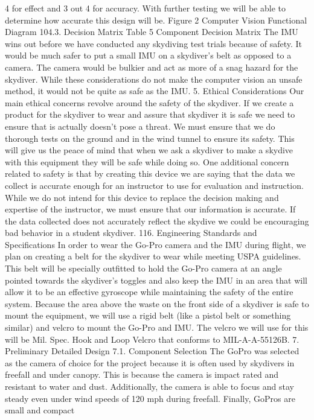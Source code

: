 4 for effect and 3 out 4 for accuracy. With further testing we will be able to determine how accurate this design will be.
Figure 2 Computer Vision Functional Diagram
104.3.
Decision Matrix
Table 5 Component Decision Matrix
The IMU wins out before we have conducted any skydiving test trials because of safety. It would be much safer to put a
small IMU on a skydiver’s belt as opposed to a camera. The camera would be bulkier and act as more of a snag hazard
for the skydiver. While these considerations do not make the computer vision an unsafe method, it would not be quite
as safe as the IMU.
5.
Ethical Considerations
Our main ethical concerns revolve around the safety of the skydiver. If we create a product for the skydiver to wear and
assure that skydiver it is safe we need to ensure that is actually doesn’t pose a threat. We must ensure that we do
thorough tests on the ground and in the wind tunnel to ensure its safety. This will give us the peace of mind that when
we ask a skydiver to make a skydive with this equipment they will be safe while doing so.
One additional concern related to safety is that by creating this device we are saying that the data we collect is accurate
enough for an instructor to use for evaluation and instruction. While we do not intend for this device to replace the
decision making and expertise of the instructor, we must ensure that our information is accurate. If the data collected
does not accurately reflect the skydive we could be encouraging bad behavior in a student skydiver.
116.
Engineering Standards and Specifications
In order to wear the Go-Pro camera and the IMU during flight, we plan on creating a belt for the skydiver to wear while
meeting USPA guidelines. This belt will be specially outfitted to hold the Go-Pro camera at an angle pointed towards the
skydiver’s toggles and also keep the IMU in an area that will allow it to be an effective gyroscope while maintaining the
safety of the entire system. Because the area above the waste on the front side of a skydiver is safe to mount the
equipment, we will use a rigid belt (like a pistol belt or something similar) and velcro to mount the Go-Pro and IMU. The
velcro we will use for this will be Mil. Spec. Hook and Loop Velcro that conforms to MIL-A-A-55126B.
7.
Preliminary Detailed Design
7.1.
Component Selection
The GoPro was selected as the camera of choice for the project because it is often used by skydivers in freefall and
under canopy. This is because the camera is impact rated and resistant to water and dust. Additionally, the camera is
able to focus and stay steady even under wind speeds of 120 mph during freefall. Finally, GoPros are small and compact

